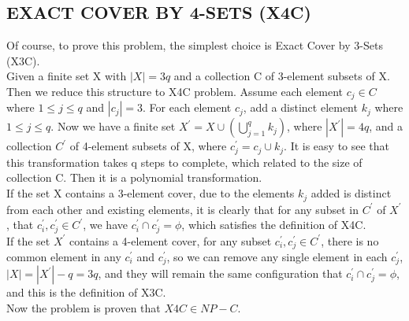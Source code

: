 \documentclass[12pt]{report}
\begin{document}
\subsection{EXACT COVER BY 4-SETS (X4C)}
Of course, to prove this problem, the simplest choice is Exact Cover by 3-Sets (X3C). \\
Given a finite set X with $|X|=3q$ and a collection C of 3-element subsets of X. Then we reduce this structure to X4C problem. Assume each element $c_{j} \in C$ where $1 \le j \le q$ and $|c_{j}| = 3$. For each element $c_{j}$, add a distinct element $k_{j}$ where $1 \le j \le q$. Now we have a finite set $X^{'} = X \cup (\bigcup_{j=1}^{q}k_{j})$, where $|X^{'}| = 4q$, and a collection $C^{'}$ of 4-element subsets of X, where $c_{j}^{'} = c_{j} \cup k_{j}$. It is easy to see that this transformation takes q steps to complete, which related to the size of collection C. Then it is a polynomial transformation. \\
If the set X contains a 3-element cover, due to the elements $k_{j}$ added is distinct from each other and existing elements, it is clearly that for any subset in $C^{'}$ of $X^{'}$, that $c^{'}_{i}, c^{'}_{j} \in C^{'}$, we have $c^{'}_{i} \cap c^{'}_{j} = \phi$, which satisfies the definition of X4C. \\
If the set $X^{'}$ contains a 4-element cover, for any subset $c^{'}_{i}, c^{'}_{j} \in C^{'}$, there is no common element in any $c^{'}_{i}$ and $c^{'}_{j}$, so we can remove any single element in each $c^{'}_{j}$, $|X| = |X^{'}| - q = 3q$, and they will remain the same configuration that $c^{'}_{i} \cap c^{'}_{j} = \phi$, and this is the definition of X3C. \\
Now the problem is proven that $X4C \in NP-C$.
\end{document}
